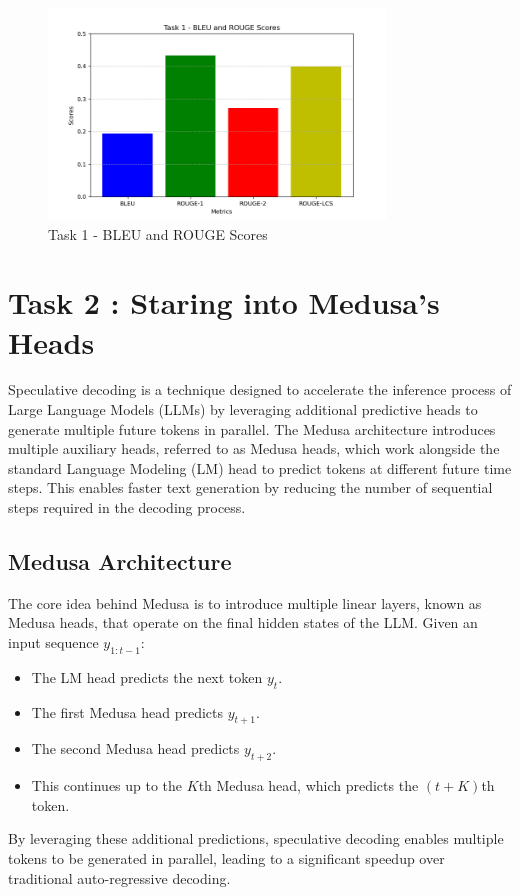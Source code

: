\documentclass[12pt]{article}
\begin{document}
\begin{figure}[htbp]
    \centering
    \includegraphics[width=0.8\textwidth]{task1.png}
    \caption{Task 1 - BLEU and ROUGE Scores}
    \label{fig:task1_scores}
\end{figure}

\newpage

\section{Task 2 : Staring into Medusa's Heads}

Speculative decoding is a technique designed to accelerate the inference process of Large Language Models (LLMs) by leveraging additional predictive heads to generate multiple future tokens in parallel. The Medusa architecture introduces multiple auxiliary heads, referred to as Medusa heads, which work alongside the standard Language Modeling (LM) head to predict tokens at different future time steps. This enables faster text generation by reducing the number of sequential steps required in the decoding process.

\subsection{Medusa Architecture}

The core idea behind Medusa is to introduce multiple linear layers, known as Medusa heads, that operate on the final hidden states of the LLM. Given an input sequence $y_{1:t-1}$:
\begin{itemize}
    \item The LM head predicts the next token $y_t$.
    \item The first Medusa head predicts $y_{t+1}$.
    \item The second Medusa head predicts $y_{t+2}$.
    \item This continues up to the $K$th Medusa head, which predicts the $(t+K)$th token.
\end{itemize}
By leveraging these additional predictions, speculative decoding enables multiple tokens to be generated in parallel, leading to a significant speedup over traditional auto-regressive decoding.
\end{document}
